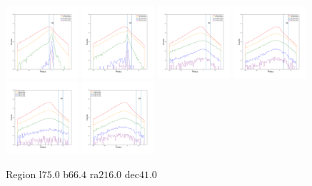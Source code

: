 \documentclass[12pt,prd]{article}
\begin{document}
\begin{figure}[h!]
\includegraphics[width=0.24\textwidth]{../figures/scanning_plotsgaiascan_l75_0_b66_4_ra216_0_dec41_0_npy_12.pdf}
\includegraphics[width=0.24\textwidth]{../figures/scanning_plotsgaiascan_l75_0_b66_4_ra216_0_dec41_0_npy_13.pdf}
\includegraphics[width=0.24\textwidth]{../figures/scanning_plotsgaiascan_l75_0_b66_4_ra216_0_dec41_0_npy_14.pdf}
\includegraphics[width=0.24\textwidth]{../figures/scanning_plotsgaiascan_l75_0_b66_4_ra216_0_dec41_0_npy_15.pdf}
\includegraphics[width=0.24\textwidth]{../figures/scanning_plotsgaiascan_l75_0_b66_4_ra216_0_dec41_0_npy_16.pdf}
\includegraphics[width=0.24\textwidth]{../figures/scanning_plotsgaiascan_l75_0_b66_4_ra216_0_dec41_0_npy_17.pdf}
\caption{Region l$75.0$ b$66.4$ ra$216.0$ dec$41.0$}
\end{figure}
\end{document}

